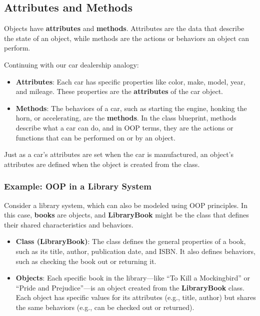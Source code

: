 \documentclass[
  letterpaper,
  DIV=11,
  numbers=noendperiod]{scrreprt}
\providecommand{\tightlist}{%
  \setlength{\itemsep}{0pt}\setlength{\parskip}{0pt}}\usepackage{longtable,booktabs,array}
\begin{document}
\hypertarget{attributes-and-methods}{%
\subsection{Attributes and Methods}\label{attributes-and-methods}}

Objects have \textbf{attributes} and \textbf{methods}. Attributes are
the data that describe the state of an object, while methods are the
actions or behaviors an object can perform.

Continuing with our car dealership analogy:

\begin{itemize}
\tightlist
\item
  \textbf{Attributes}: Each car has specific properties like color,
  make, model, year, and mileage. These properties are the
  \textbf{attributes} of the car object.
\item
  \textbf{Methods}: The behaviors of a car, such as starting the engine,
  honking the horn, or accelerating, are the \textbf{methods}. In the
  class blueprint, methods describe what a car can do, and in OOP terms,
  they are the actions or functions that can be performed on or by an
  object.
\end{itemize}

Just as a car's attributes are set when the car is manufactured, an
object's attributes are defined when the object is created from the
class.

\hypertarget{example-oop-in-a-library-system}{%
\subsubsection{Example: OOP in a Library
System}\label{example-oop-in-a-library-system}}

Consider a library system, which can also be modeled using OOP
principles. In this case, \textbf{books} are objects, and
\textbf{LibraryBook} might be the class that defines their shared
characteristics and behaviors.

\begin{itemize}
\tightlist
\item
  \textbf{Class (LibraryBook)}: The class defines the general properties
  of a book, such as its title, author, publication date, and ISBN. It
  also defines behaviors, such as checking the book out or returning it.
\item
  \textbf{Objects}: Each specific book in the library---like ``To Kill a
  Mockingbird'' or ``Pride and Prejudice''---is an object created from
  the \textbf{LibraryBook} class. Each object has specific values for
  its attributes (e.g., title, author) but shares the same behaviors
  (e.g., can be checked out or returned).
\end{itemize}
\end{document}
